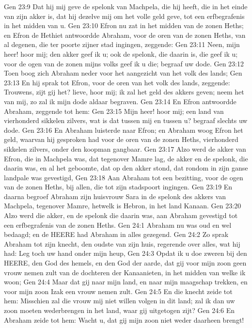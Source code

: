 Gen 23:9  Dat hij mij geve de spelonk van Machpela, die hij heeft, die in het einde van zijn akker is, dat hij dezelve mij om het volle geld geve, tot een erfbegrafenis in het midden van u.
Gen 23:10  Efron nu zat in het midden van de zonen Heths; en Efron de Hethiet antwoordde Abraham, voor de oren van de zonen Heths, van al degenen, die ter poorte zijner stad ingingen, zeggende:
Gen 23:11  Neen, mijn heer! hoor mij; den akker geef ik u; ook de spelonk, die daarin is, die geef ik u; voor de ogen van de zonen mijns volks geef ik u die; begraaf uw dode.
Gen 23:12  Toen boog zich Abraham neder voor het aangezicht van het volk des lands;
Gen 23:13  En hij sprak tot Efron, voor de oren van het volk des lands, zeggende: Trouwens, zijt gij het? lieve, hoor mij; ik zal het geld des akkers geven; neem het van mij, zo zal ik mijn dode aldaar begraven.
Gen 23:14  En Efron antwoordde Abraham, zeggende tot hem:
Gen 23:15  Mijn heer! hoor mij; een land van vierhonderd sikkelen zilvers, wat is dat tussen mij en tussen u? begraaf slechts uw dode.
Gen 23:16  En Abraham luisterde naar Efron; en Abraham woog Efron het geld, waarvan hij gesproken had voor de oren van de zonen Heths, vierhonderd sikkelen zilvers, onder den koopman gangbaar.
Gen 23:17  Alzo werd de akker van Efron, die in Machpela was, dat tegenover Mamre lag, de akker en de spelonk, die daarin was, en al het geboomte, dat op den akker stond, dat rondom in zijn ganse landpale was gevestigd,
Gen 23:18  Aan Abraham tot een bezitting, voor de ogen van de zonen Heths, bij allen, die tot zijn stadspoort ingingen.
Gen 23:19  En daarna begroef Abraham zijn huisvrouw Sara in de spelonk des akkers van Machpela, tegenover Mamre, hetwelk is Hebron, in het land Kanaan.
Gen 23:20  Alzo werd die akker, en de spelonk die daarin was, aan Abraham gevestigd tot een erfbegrafenis van de zonen Heths.
Gen 24:1  Abraham nu was oud en wel bedaagd; en de HEERE had Abraham in alles gezegend.
Gen 24:2  Zo sprak Abraham tot zijn knecht, den oudste van zijn huis, regerende over alles, wat hij had: Leg toch uw hand onder mijn heup,
Gen 24:3  Opdat ik u doe zweren bij den HEERE, den God des hemels, en den God der aarde, dat gij voor mijn zoon geen vrouw nemen zult van de dochteren der Kanaanieten, in het midden van welke ik woon;
Gen 24:4  Maar dat gij naar mijn land, en naar mijn maagschap trekken, en voor mijn zoon Izak een vrouw nemen zult.
Gen 24:5  En die knecht zeide tot hem: Misschien zal die vrouw mij niet willen volgen in dit land; zal ik dan uw zoon moeten wederbrengen in het land, waar gij uitgetogen zijt?
Gen 24:6  En Abraham zeide tot hem: Wacht u, dat gij mijn zoon niet weder daarheen brengt!
